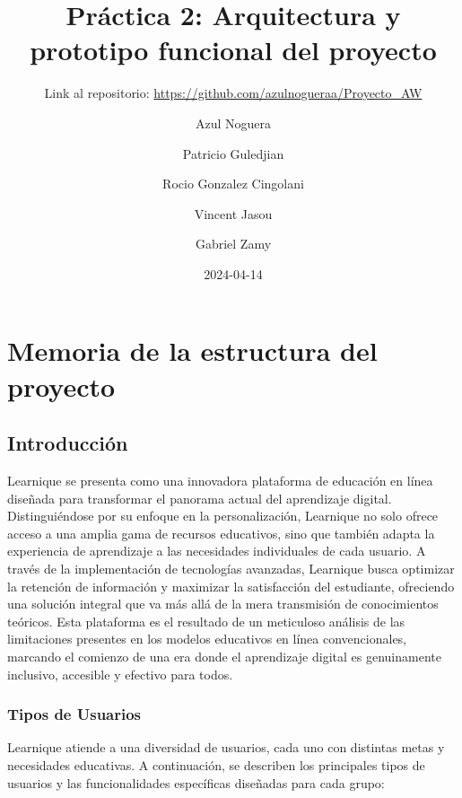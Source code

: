 \documentclass[
]{article}
\title{Práctica 2: Arquitectura y prototipo funcional del proyecto}
\subtitle{Link al repositorio:
\url{https://github.com/azulnogueraa/Proyecto_AW}}
\author{Azul Noguera \and Patricio Guledjian \and Rocio Gonzalez
Cingolani \and Vincent Jasou \and Gabriel Zamy}
\date{2024-04-14}
\begin{document}
\maketitle

{
\setcounter{tocdepth}{3}
\tableofcontents
}
\newpage

\section*{Memoria de la estructura del proyecto}

\subsection{Introducción}\label{introducciuxf3n}

Learnique se presenta como una innovadora plataforma de educación en
línea diseñada para transformar el panorama actual del aprendizaje
digital. Distinguiéndose por su enfoque en la personalización, Learnique
no solo ofrece acceso a una amplia gama de recursos educativos, sino que
también adapta la experiencia de aprendizaje a las necesidades
individuales de cada usuario. A través de la implementación de
tecnologías avanzadas, Learnique busca optimizar la retención de
información y maximizar la satisfacción del estudiante, ofreciendo una
solución integral que va más allá de la mera transmisión de
conocimientos teóricos. Esta plataforma es el resultado de un meticuloso
análisis de las limitaciones presentes en los modelos educativos en
línea convencionales, marcando el comienzo de una era donde el
aprendizaje digital es genuinamente inclusivo, accesible y efectivo para
todos.

\subsubsection{Tipos de Usuarios}\label{tipos-de-usuarios}

Learnique atiende a una diversidad de usuarios, cada uno con distintas
metas y necesidades educativas. A continuación, se describen los
principales tipos de usuarios y las funcionalidades específicas
diseñadas para cada grupo:
\end{document}
